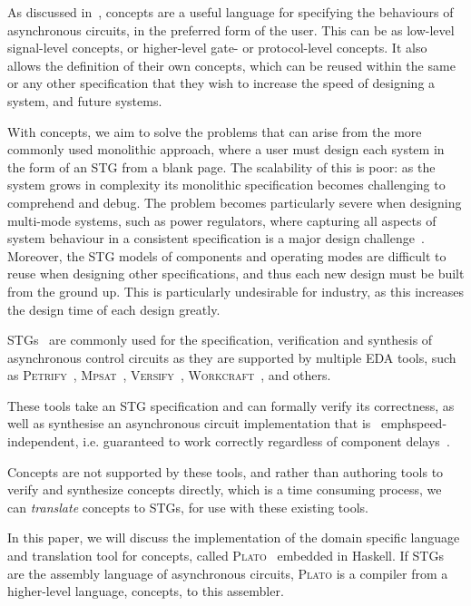 \documentclass[british,conference,compsoc]{IEEEtran}
\newcommand{\noun}[1]{\textsc{#1}}
\begin{document}
As discussed in~\cite{2015_Beaumont_MEMOCODE}, concepts are a useful language 
for specifying the behaviours of asynchronous circuits, in the preferred form 
of the user. This can be as low-level signal-level concepts, or higher-level 
gate- or protocol-level concepts. It also allows the definition of their own 
concepts, which can be reused within the same or any other specification that 
they wish to increase the speed of designing a system, and future systems. 

With concepts, we aim to solve the problems that can arise from the more 
commonly used monolithic approach, where a user must design each system in the 
form of an STG from a blank page. The scalability of this is poor: as the 
system grows in complexity its monolithic specification becomes challenging to 
comprehend and debug. The problem becomes particularly severe when designing 
multi-mode systems, such as power regulators, where capturing all aspects of 
system behaviour in a consistent specification is a major design 
challenge~\cite{2014_sokolov_ftfc}\cite{sokolov2015design}. 
Moreover, the STG models of components and operating modes are difficult to 
reuse when designing other specifications, and thus each new design must be 
built from the ground up. This is particularly undesirable for industry, as 
this increases the design time of each design greatly. 

STGs~\cite{Chu_1987_phd}\cite{Rosenblum_1985_tpn} are commonly used for the 
specification, verification and synthesis of asynchronous control circuits as 
they are supported by multiple EDA tools, such as 
\noun{Petrify}~\cite{Cortadella}, \noun{Mpsat}~\cite{khomenko2004detecting}, 
\noun{Versify}~\cite{i1997formal}, 
\noun{Workcraft}~\cite{2007_poliakov_workcraft}\cite{Workcraft_website}, 
and others.

These tools take an STG specification and can formally verify its correctness, 
as well as synthesise an asynchronous circuit implementation that is \
emph{speed-independent}, i.e. guaranteed to work correctly regardless of 
component delays~\cite{Muller_1959_ts}.

Concepts are not supported by these tools, and rather than
authoring tools to verify and synthesize concepts directly, which is a time 
consuming process, we can \emph{translate} concepts to STGs, for use with these
existing tools.

In this paper, we will discuss the implementation of the domain specific 
language and translation tool for concepts, called 
\noun{Plato}~\cite{2016_concepts_github} embedded in Haskell. 
If STGs are the assembly language of asynchronous circuits, \noun{Plato} is a 
compiler from a higher-level language, concepts, to this assembler. 
\end{document}
